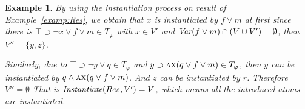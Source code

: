 \documentclass{article}
\newtheorem{example}{Example}
\begin{document}
\begin{example}\label{exa:until:sub}
By using the instantiation process on result of Example~\ref{examp:Res}, we obtain that $x$ is instantiated by $f\vee m$ at first since there is $\top \supset \neg x \vee f \vee m \in T_{\varphi}$ with $x \in V'$ and $\textit{Var}(f \vee m) \cap (V\cup V') = \emptyset$, then $V''=\{y,z\}$.

Similarly, due to $\top \supset \neg y \vee q \in T_{\varphi}$ and $y \supset \textsc{a}\textsc{x}(q \vee f\vee m)\in T_{\varphi}$, then $y$ can be instantiated by $q \wedge \textsc{a}\textsc{x}(q \vee f\vee m)$. And $z$ can be instantiated by $r$. Therefore $V''=\emptyset$
That is $\emph{Instantiate}(Res, V') = V$, which means all the introduced atoms are instantiated.
%
%

\end{example}
\end{document}
